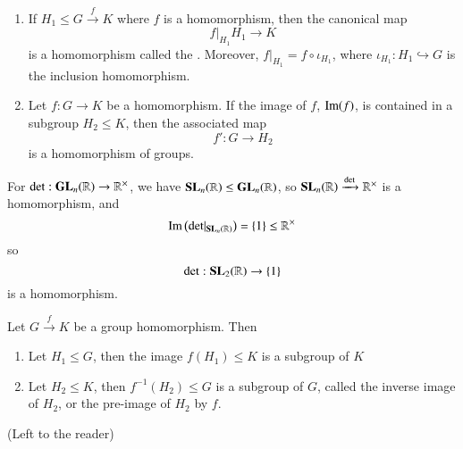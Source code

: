 \documentclass[12pt, a4paper, twoside, openright, titlepage]{book}
\begin{document}
\begin{rmk}{}{}
    \leavevmode
    \begin{enumerate}
        \item If $H_1 \leq G\xrightarrow{f} K$ where $f$ is a homomorphism, then the canonical map \begin{equation}
            f\rvert_{H_1}H_1\rightarrow K
        \end{equation}
        is a homomorphism called the . Moreover, $f\rvert_{H_1} = f \circ \iota_{H_1}$, where $\iota_{H_1}:H_1\hookrightarrow G$ is the inclusion homomorphism.
        \item Let $f:G\rightarrow K$ be a homomorphism. If the image of $f$, $\operatorname{Im}(f)$, is contained in a subgroup $H_2 \leq K$, then the associated map \begin{equation}
            f':G\rightarrow H_2
        \end{equation}
        is a homomorphism of groups.
    \end{enumerate}
\end{rmk}

\begin{eg}{}{}
    For $\det:\mathbf{GL}_n(\mathbb R)\rightarrow \mathbb R^{\times}$, we have $\mathbf{SL}_n(\mathbb R) \leq \mathbf{GL}_n(\mathbb R)$, so $\mathbf{SL}_n(\mathbb R)\xrightarrow{\det}\mathbb R^{\times}$ is a homomorphism, and \begin{equation}
        \operatorname{Im}\left(\det\rvert_{\mathbf{SL}_n(\mathbb R)}\right) = \{1\} \leq \mathbb R^{\times}
    \end{equation}
    so \begin{equation}
        \det:\mathbf{SL}_2(\mathbb R)\rightarrow \{1\}
    \end{equation}
    is a homomorphism.
\end{eg}


\begin{prop}{}{}
    Let $G\xrightarrow{f} K$ be a group homomorphism. Then \begin{enumerate}
        \item Let $H_1 \leq G$, then the image $f(H_1) \leq K$ is a subgroup of $K$
        \item Let $H_2 \leq K$, then $f^{-1}(H_2) \leq G$ is a subgroup of $G$, called the inverse image of $H_2$, or the pre-image of $H_2$ by $f$.
    \end{enumerate}
\end{prop}
\begin{proof*}{}{}
    (Left to the reader)
\end{proof*}
\end{document}
